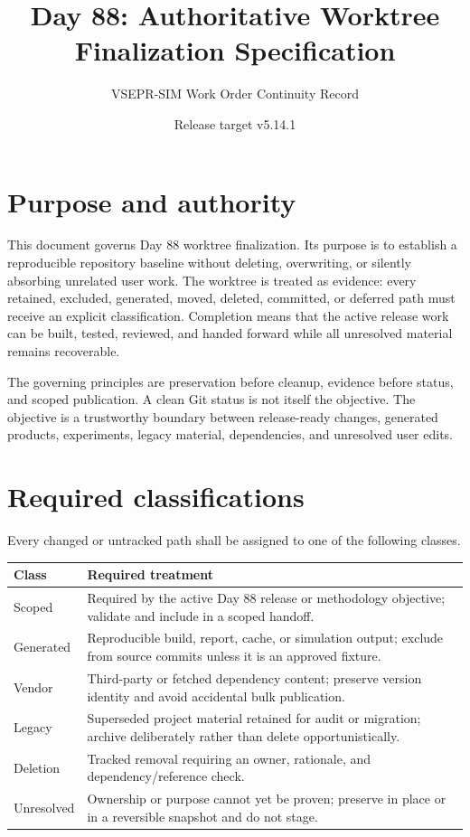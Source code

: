 \documentclass[10pt]{article}
\title{Day 88: Authoritative Worktree Finalization Specification}
\author{VSEPR-SIM Work Order Continuity Record}
\date{Release target v5.14.1}
\begin{document}
\maketitle

\section*{Purpose and authority}
This document governs Day 88 worktree finalization. Its purpose is to establish a reproducible repository baseline without deleting, overwriting, or silently absorbing unrelated user work. The worktree is treated as evidence: every retained, excluded, generated, moved, deleted, committed, or deferred path must receive an explicit classification. Completion means that the active release work can be built, tested, reviewed, and handed forward while all unresolved material remains recoverable.

The governing principles are preservation before cleanup, evidence before status, and scoped publication. A clean Git status is not itself the objective. The objective is a trustworthy boundary between release-ready changes, generated products, experiments, legacy material, dependencies, and unresolved user edits.

\section*{Required classifications}
Every changed or untracked path shall be assigned to one of the following classes.

\begin{center}
\begin{tabularx}{\textwidth}{@{}lX@{}}
\toprule
Class & Required treatment \\
\midrule
Scoped & Required by the active Day 88 release or methodology objective; validate and include in a scoped handoff. \\
Generated & Reproducible build, report, cache, or simulation output; exclude from source commits unless it is an approved fixture. \\
Vendor & Third-party or fetched dependency content; preserve version identity and avoid accidental bulk publication. \\
Legacy & Superseded project material retained for audit or migration; archive deliberately rather than delete opportunistically. \\
Deletion & Tracked removal requiring an owner, rationale, and dependency/reference check. \\
Unresolved & Ownership or purpose cannot yet be proven; preserve in place or in a reversible snapshot and do not stage. \\
\bottomrule
\end{tabularx}
\end{center}
\end{document}
